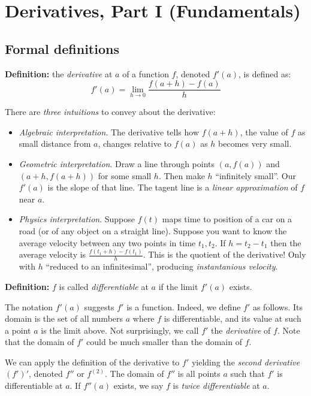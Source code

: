
\section{Derivatives, Part I (Fundamentals)}

\subsection{Formal definitions}

\textbf{Definition:} the \textit{derivative} at $a$ of a function $f$,
denoted $f'(a)$, is defined as:
\[f'(a)=\lim_{h\to0}\frac{f(a+h)-f(a)}{h}\]

There are \textit{three intuitions} to convey about the derivative:
\begin{itemize}
\item \textit{Algebraic interpretation}. The derivative tells how
  $f(a+h)$, the value of $f$ as small distance from $a$, changes
  relative to $f(a)$ as $h$ becomes very small.
\item \textit{Geometric interpretation}. Draw a line through points
  $(a, f(a))$ and $(a+h, f(a+h))$ for some small $h$. Then make $h$
  ``infinitely small''. Our $f'(a)$ is the slope of that line. The
  tagent line is a \textit{linear approximation} of $f$ near $a$.
\item \textit{Physics interpretation}. Suppose $f(t)$ maps time to
  position of a car on a road (or of any object on a straight line).
  Suppose you want to know the average velocity between any two points
  in time $t_1, t_2$. If $h=t_2-t_1$ then the average velocity is
  $\frac{f(t_1+h)-f(t_1)}{h}$. This is the quotient of the derivative!
  Only with $h$ ``reduced to an infinitesimal'', producing
  \textit{instantanious velocity}.
\end{itemize}

\textbf{Definition:} $f$ is called \textit{differentiable} at $a$ if
the limit $f'(a)$ exists.

\vs

The notation $f'(a)$ suggests $f'$ is a function. Indeed, we define
$f'$ as follows. Its domain is the set of all numbers $a$ where $f$ is
differentiable, and its value at such a point $a$ is the limit above.
Not surprisingly, we call $f'$ the \textit{derivative} of $f$. Note
that the domain of $f'$ could be much smaller than the domain of $f$.

\vs

We can apply the definition of the derivative to $f'$ yielding the
\textit{second derivative} $(f')'$, denoted $f''$ or $f^{(2)}$. The
domain of $f''$ is all points $a$ such that $f'$ is differentiable at
$a$. If $f''(a)$ exists, we say $f$ is \textit{twice differentiable}
at $a$.

